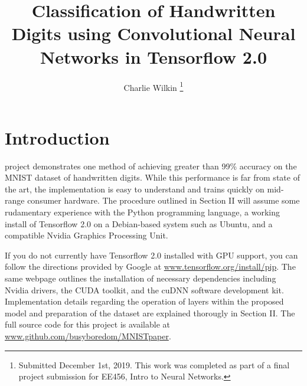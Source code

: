 \documentclass[transmag]{IEEEtran}
\begin{document}
\title{Classification of Handwritten Digits using Convolutional Neural Networks
in Tensorflow 2.0}

\author{Charlie Wilkin
\thanks{Submitted December 1st, 2019. This work was completed as part of a 
final project submission for EE456, Intro to Neural Networks.}}


\maketitle

\section{Introduction}

 project demonstrates one method of achieving greater than
99\% accuracy on the MNIST dataset of handwritten digits. While this
performance is far from state of the art, the implementation is easy to
understand and trains quickly on mid-range consumer hardware. The procedure 
outlined in Section II will assume some rudamentary experience with the
Python programming language, a working install of Tensorflow 2.0 on
a Debian-based system such as Ubuntu, and a compatible Nvidia Graphics
Processing Unit. 

If you do not currently have Tensorflow 2.0 installed with GPU support, you
can follow the directions provided by Google at 
\href{https://www.tensorflow.org/install/gpu}{www.tensorflow.org/install/pip}.
The same webpage outlines the installation of necessary dependencies including
Nvidia drivers, the CUDA toolkit, and the cuDNN software development kit. 
Implementation details regarding the operation of layers within the proposed
model and preparation of the dataset are explained thorougly in Section II. The
full source code for this project is available at 
\href{https://www.github.com/busyboredom/MNISTpaper}
{www.github.com/busyboredom/MNISTpaper}.
\end{document}

